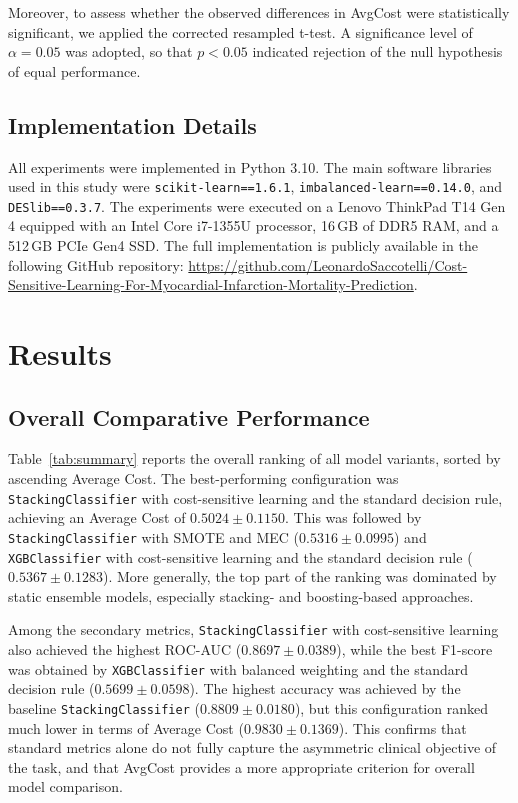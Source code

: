 \documentclass[conference]{IEEEtran}
\begin{document}
Moreover, to assess whether the observed differences in AvgCost were statistically significant, we applied the corrected resampled t-test. A significance level of \(\alpha = 0.05\) was adopted, so that \(p < 0.05\) indicated rejection of the null hypothesis of equal performance.

\subsection{Implementation Details}

All experiments were implemented in Python 3.10. The main software libraries used in this study were \texttt{scikit-learn==1.6.1}, \texttt{imbalanced-learn==0.14.0}, and \texttt{DESlib==0.3.7}. The experiments were executed on a Lenovo ThinkPad T14 Gen 4 equipped with an Intel Core i7-1355U processor, 16\,GB of DDR5 RAM, and a 512\,GB PCIe Gen4 SSD. The full implementation is publicly available in the following GitHub repository: \url{https://github.com/LeonardoSaccotelli/Cost-Sensitive-Learning-For-Myocardial-Infarction-Mortality-Prediction}. 

\section{Results} \label{sec:results}
\subsection{Overall Comparative Performance}

Table~\ref{tab:summary} reports the overall ranking of all model variants, sorted by ascending Average Cost. The best-performing configuration was \texttt{StackingClassifier} with cost-sensitive learning and the standard decision rule, achieving an Average Cost of \(0.5024 \pm 0.1150\). This was followed by \texttt{StackingClassifier} with SMOTE and MEC (\(0.5316 \pm 0.0995\)) and \texttt{XGBClassifier} with cost-sensitive learning and the standard decision rule (\(0.5367 \pm 0.1283\)). More generally, the top part of the ranking was dominated by static ensemble models, especially stacking- and boosting-based approaches.

Among the secondary metrics, \texttt{StackingClassifier} with cost-sensitive learning also achieved the highest ROC-AUC (\(0.8697 \pm 0.0389\)), while the best F1-score was obtained by \texttt{XGBClassifier} with balanced weighting and the standard decision rule (\(0.5699 \pm 0.0598\)). The highest accuracy was achieved by the baseline \texttt{StackingClassifier} (\(0.8809 \pm 0.0180\)), but this configuration ranked much lower in terms of Average Cost (\(0.9830 \pm 0.1369\)). This confirms that standard metrics alone do not fully capture the asymmetric clinical objective of the task, and that AvgCost provides a more appropriate criterion for overall model comparison.
\end{document}
